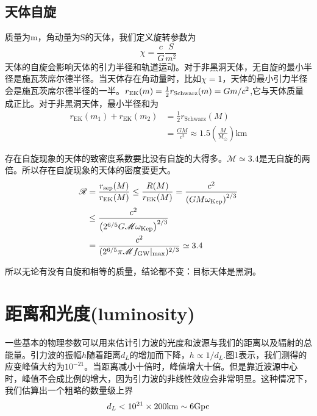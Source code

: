 \documentclass[UTF8]{ctexart}
\begin{document}
\subsection{天体自旋}
质量为m，角动量为S的天体，我们定义旋转参数为
\begin{equation}
\chi = \frac{c}{G}\frac{S}{m^2}
\end{equation}
天体的自旋会影响天体的引力半径和轨道运动。对于非黑洞天体，无自旋的最小半径是施瓦茨席尔德半径。当天体存在角动量时，比如$\chi=1$，天体的最小引力半径会是施瓦茨席尔德半径的一半。$r_{\rm EK}(m) =\frac{1}{2}r_{\rm Schwarz}(m)=Gm/c^2 $,它与天体质量成正比。对于非黑洞天体，最小半径和为
\begin{equation}
\begin{aligned}
r_{\mathrm{EK}}\left(m_{1}\right)+r_{\mathrm{EK}}\left(m_{2}\right) &=\frac{1}{2} r_{\mathrm{Schwarz}}(M) \\
&=\frac{G M}{c^{2}} \approx 1.5\left(\frac{M}{\mathrm{M}_{\odot}}\right) \mathrm{km}
\end{aligned}
\end{equation}

存在自旋现象的天体的致密度系数要比没有自旋的大得多。$\mathscr{M}\simeq3.4$是无自旋的两倍。所以存在自旋现象的天体的密度要更大。
\begin{equation}
\begin{aligned}
\mathscr{R} &=\frac{r_{\mathrm{sep}}(M)}{r_{\mathrm{EK}}(M)} \leq \frac{R(M)}{r_{\mathrm{EK}}(M)}=\frac{c^{2}}{\left(G M \omega_{\mathrm{Kep}}\right)^{2 / 3}} \\
& \leq \frac{c^{2}}{\left(2^{6 / 5} G \mathscr{M} \omega_{\mathrm{Kep}}\right)^{2 / 3}} \\
& = \frac{c^2}{(2^{6/5}\pi\mathscr{M}f_{\rm GW}|_{\rm max})^{2/3}} \simeq 3.4\end{aligned}
\end{equation}

所以无论有没有自旋和相等的质量，结论都不变：目标天体是黑洞。

\section{距离和光度(luminosity)}
一些基本的物理参数可以用来估计引力波的光度和波源与我们的距离以及辐射的总能量。引力波的振幅$h$随着距离$d_L$的增加而下降，$h\propto1/d_L$.图1表示，我们测得的应变峰值大约为$10^{-21}$。当距离减小十倍时，峰值增大十倍。但是靠近波源中心时，峰值不会成比例的增大，因为引力波的非线性效应会非常明显。这种情况下，我们估算出一个粗略的数量级上界
\begin{equation}
d_L<10^{21}\times200{\rm km}\sim6{\rm Gpc}
\end{equation}
\end{document}
